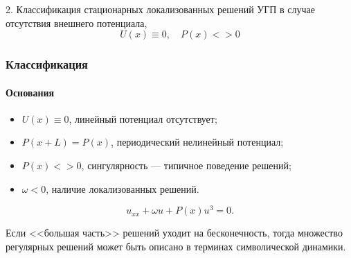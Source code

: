 \documentclass [10pt] {beamer}
\begin{document}

\begin{frame}
	\begin{center}
		{\LARGE 2. Классификация стационарных локализованных решений УГП в случае отсутствия внешнего потенциала, $$U(x) \equiv 0, \quad P(x) <> 0$$}
	\end{center}
\end{frame}

\begin{frame}
	\frametitle{Классификация}
	\framesubtitle{Основания}
	
	\begin{itemize}
		\item $U(x) \equiv 0$, линейный потенциал отсутствует;
		\item $P(x + L) = P(x)$, периодический нелинейный потенциал;
		\item $P(x) <> 0$, сингулярность --- типичное поведение решений;
		\item $\omega < 0$, наличие локализованных решений.
	\end{itemize}
	
	\begin{equation}
		u_{xx} + \omega u + P(x) u^3 = 0.
		\label{eq:classification}
	\end{equation}
	
	\medskip
	
	Если <<большая часть>> решений уходит на бесконечность, тогда множество регулярных решений может быть описано в терминах символической динамики\footnotemark[3].
	
\end{frame}
\end{document}

